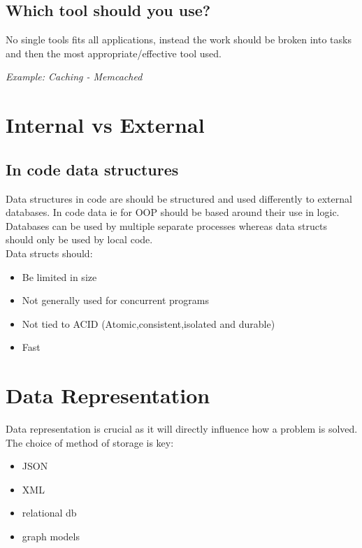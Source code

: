 \documentclass[11pt]{scrartcl} %
\begin{document}
\subsection{Which tool should you use?}

No single tools fits all applications, instead the work should be broken into tasks
and then the most appropriate/effective tool used. 

\textit{Example: Caching - Memcached}

\section{Internal vs External}

\subsection{In code data structures}

Data structures in code are should be structured and used differently to external databases. In code
data ie for OOP should be based around their use in logic. Databases can be used by multiple separate
processes whereas data structs should only be used by local code.\\

Data structs should:

\begin{itemize}
	\item Be limited in size
	\item Not generally used for concurrent programs
	\item Not tied to ACID (Atomic,consistent,isolated and durable)
	\item Fast
\end{itemize}

\section{Data Representation}

Data representation is crucial as it will directly influence how a problem is solved. The choice of method of storage is
key:

\begin{itemize}
	\item JSON
	\item XML
	\item relational db
	\item graph models
\end{itemize}
\end{document}
